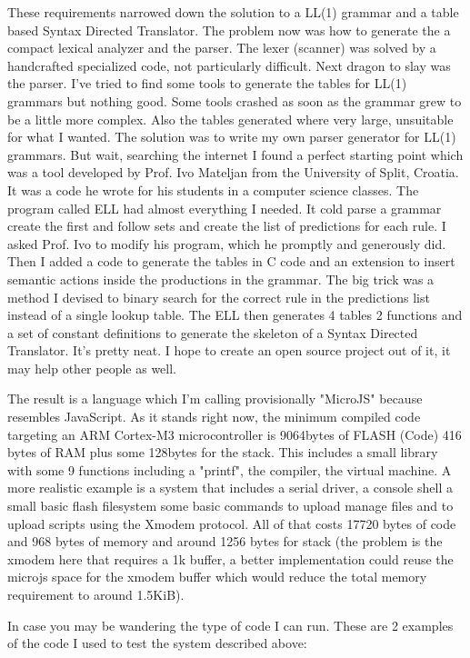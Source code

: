 \documentclass[11pt]{article} %
\begin{document}
These requirements narrowed down the solution to a LL(1) grammar and a table based Syntax Directed Translator. The problem now was how to generate the a compact lexical analyzer and the parser. The lexer (scanner) was solved by a handcrafted specialized code, not particularly difficult. 
Next dragon to slay was the parser. I've tried to find some tools to generate the tables for LL(1) grammars but nothing good. Some tools crashed as soon as the grammar grew to be a little more complex. Also the tables generated where very large, unsuitable for what I wanted. The solution was to write my own parser generator for LL(1) grammars. But wait, searching the internet I found a perfect starting point which was a tool developed by Prof. Ivo Mateljan from the University of Split, Croatia. It was a code he wrote for his students in a computer science classes. The program called ELL had almost everything I needed. It cold parse a grammar create the first and follow sets and create the list of predictions for each rule. I asked Prof. Ivo to modify his program, which he promptly and generously did. Then I added a code to generate the tables in C code and an extension to insert semantic actions inside the productions in the grammar. The big trick was a method I devised to binary search for the correct rule in the predictions list instead of a single lookup table. The ELL then generates 4 tables 2 functions and a set of constant definitions to generate the skeleton of a Syntax Directed Translator. It's pretty neat. I hope to create an open source project out of it, it may help other people as well.

The result is a language which I'm calling provisionally "MicroJS" because resembles JavaScript. 
As it stands right now, the minimum compiled code targeting an ARM Cortex-M3 microcontroller is 9064bytes of FLASH (Code) 416 bytes of RAM plus some 128bytes for the stack. This includes a small library with some 9 functions including a "printf", the compiler, the virtual machine. 
A more realistic example is a system that includes a serial driver, a console shell a small basic flash filesystem some basic commands to upload manage files and to upload scripts using the Xmodem protocol. All of that costs 17720 bytes of code and 968 bytes of memory and around 1256 bytes for stack (the problem is the xmodem here that requires a 1k buffer, a better implementation could reuse the microjs space for the xmodem buffer which would reduce the total memory requirement to around 1.5KiB).

In case you may be wandering the type of code I can run. These are 2 examples of the code I used to test the system described above:
\end{document}
